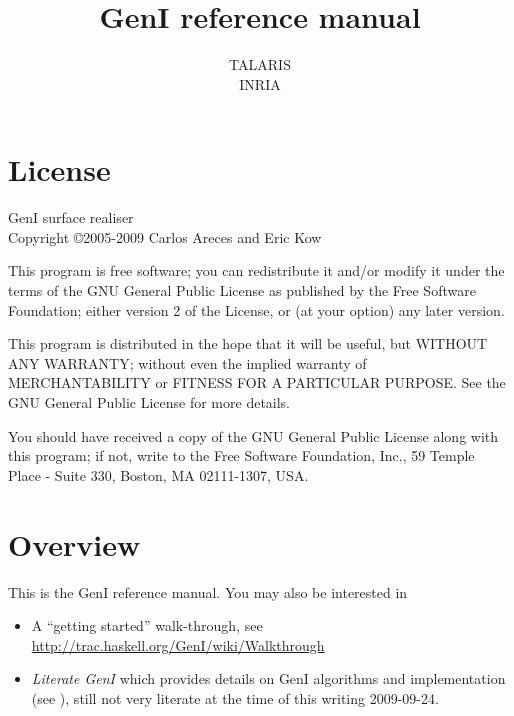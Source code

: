 \documentclass[a4paper,11pt]{report}
\begin{document}
\title{GenI reference manual}
\author{TALARIS\\INRIA}

\maketitle
\tableofcontents


\chapter*{License}

GenI surface realiser\\
Copyright \copyright 2005-2009 Carlos Areces and Eric Kow

\bigskip

This program is free software; you can redistribute it and/or
modify it under the terms of the GNU General Public License
as published by the Free Software Foundation; either version 2
of the License, or (at your option) any later version.

\bigskip

This program is distributed in the hope that it will be useful,
but WITHOUT ANY WARRANTY; without even the implied warranty of
MERCHANTABILITY or FITNESS FOR A PARTICULAR PURPOSE.  See the
GNU General Public License for more details.

\bigskip

You should have received a copy of the GNU General Public License
along with this program; if not, write to the Free Software
Foundation, Inc., 59 Temple Place - Suite 330, Boston, MA  02111-1307, USA.

\chapter{Overview}

This is the GenI reference manual.  You may also be interested in

\begin{itemize}
\item A ``getting started'' walk-through,
      see \url{http://trac.haskell.org/GenI/wiki/Walkthrough}
\item \textit{Literate GenI} which provides details on GenI
      algorithms and implementation (see \cite{literateGeni}),
      still not very literate at the time of this writing
      2009-09-24.
\end{itemize}
\end{document}
